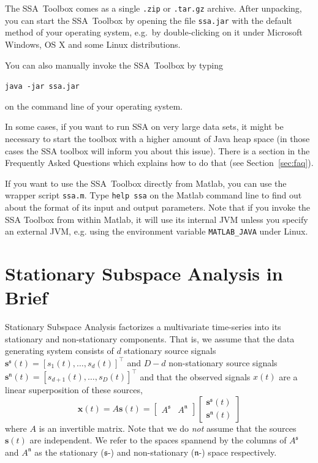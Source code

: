\documentclass{article}
\newcommand{\1}{\ensuremath{\mathds{1}}}
\newcommand{\s}{\ensuremath{\mathfrak{s}}}
\newcommand{\n}{\ensuremath{\mathfrak{n}}}
\newcommand{\0}{\ensuremath{0}}
\begin{document}
The SSA~Toolbox comes as a single \texttt{.zip} or \texttt{.tar.gz} archive. 
After unpacking, you can start the SSA~Toolbox by opening the file \texttt{ssa.jar}
with the default method of your operating system, e.g.~by double-clicking on it under 
Microsoft Windows, OS X and some Linux distributions.

You can also manually invoke the SSA~Toolbox by typing
\begin{center}
  \texttt{java -jar ssa.jar}
\end{center}
on the command line of your operating system.

In some cases, if you want to run SSA on very large data sets, it might be necessary to start the toolbox
with a higher amount of Java heap space (in those cases the SSA toolbox will inform you
about this issue). There is a section in the Frequently Asked Questions which explains how to do that
(see Section~\ref{sec:faq}).

If you want to use the SSA~Toolbox directly 
from Matlab, you can use the wrapper script \texttt{ssa.m}. Type \texttt{help ssa} on 
the Matlab command line to find out about the format of its input and output parameters. 
Note that if you invoke the SSA Toolbox from within Matlab, it will use its
internal JVM unless you specify an external JVM, e.g. using the environment
variable \texttt{MATLAB\_JAVA} under Linux.

\section{Stationary Subspace Analysis in Brief}

Stationary Subspace Analysis \cite{PRL:SSA:2009} factorizes a multivariate time-series 
into its stationary and non-stationary components. That is, we assume that the data 
generating system consists of $d$ stationary source signals 
${\mathbf s^\s}(t) = [s_1(t), \dots, s_d(t)]^\top$ and $D-d$ non-stationary source signals
${\mathbf s^\n}(t) = [s_{d+1}(t), \dots, s_D(t)]^\top$ and that the observed signals 
$x(t)$ are a linear superposition of these sources,
\begin{equation}
  {\mathbf x}(t) = A {\mathbf s}(t) = 
    \begin{bmatrix} A^{\s} & A^{\n} \end{bmatrix}
    \begin{bmatrix} {\mathbf s^{\s}}(t) \\ {\mathbf s^{\n}}(t) \end{bmatrix}
\label{eq:mixing_model}
\end{equation}
where $A$ is an invertible matrix. Note that we do \textit{not} assume that 
the sources ${\mathbf s}(t)$ are independent. We refer to the spaces spannend 
by the columns of $A^{\s}$ and $A^{\n}$ as the stationary ($\s$-) and 
non-stationary ($\n$-) space respectively.  
\end{document}
